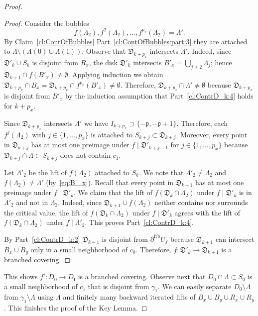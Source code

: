 \documentclass[]{amsart}
\newcommand{\bLambda}{{\mathbb{\Lambda}}}
\newcommand{\pp}{\mathfrak{p}}
\renewcommand{\tt}{\mathfrak{t}}
\newcommand\frb{{\operatorname{frb}}}
\theoremstyle{remark}
\numberwithin{equation}{section}
\theoremstyle{definition}
\begin{document}
\begin{proof}
\begin{proof}
Consider the bubbles \[f(\bLambda_2),f^2(\bLambda_2), \dots , f^{p_x}(\bLambda_2)=\bLambda'.\]
By Claim~\ref{cl:ContOfBubbles} Part~\eqref{cl:ContOfBubbles:part:3} they are attached to $\bLambda\setminus (\Lambda(0)\cup \Lambda(1))$. Observe that $\mathfrak D_{k+p_x}$ intersects $\bLambda'$. Indeed, since $\mathfrak D'_k\cup S_k$ is disjoint from $R_x$, the disk $\mathfrak D'_k$ intersects $B'_x=\bigcup_{j\ge 2} \bLambda_j$; hence $\mathfrak D_{k+1}\cap f(B'_x)\not=\emptyset$. Applying induction we obtain $\mathfrak D_{k+p_x}\cap B_x={\mathfrak D_{k+p_x}\cap f^{p_x}(B'_x)\not=\emptyset}$. Therefore, $\mathfrak D_{k+p_x}\cap \bLambda'\not=\emptyset$ because $\mathfrak D_{k+p_x}$ is disjoint from $B'_x$ by the induction assumption that Part~\eqref{cl:ContrD_k:4} holds for $k+p_x$.  



Since $\mathfrak D_{k+p_x}$ intersects $\bLambda'$ we have $I_{k+p_x}\supset \{-\pp, -\pp+1\}$. Therefore, each $f^j(\bLambda_2)$ with $j\in \{1,\dots, p_x\}$ is attached to $S_{k+j}\subset \overline {\mathfrak D_{k+j}}$. Moreover, every point in $\mathfrak D_{k+j}$ has at most one preimage under $f\mid \mathfrak D'_{k+j-1}$ for $j\in \{1,\dots, p_x\}$ because ${\mathfrak D_{k+j}\cap \bLambda  \subset S_{k+j}}$ does not contain $c_1$.


Let $\bLambda'_2$ be the lift of $f(\bLambda_2)$ attached to $S_{k}$. We note that $\bLambda'_2\not=\bLambda_2$ and $f(\bLambda_2)\not=\bLambda'$ (by~\eqref{eq:B'_x}). Recall that every point in $\mathfrak D_{k+1}$ has at most one preimage under $f\mid \mathfrak D'_k$. We claim that the lift of $f(\mathfrak D_k \cap \bLambda_2)$ under $f\mid \mathfrak D'_k$ is in $\bLambda'_2$ and not in $\bLambda_2$. Indeed, since $\mathfrak D_{k+1} \cup f(\bLambda_2)$ neither contains nor surrounds the critical value, the lift of $f(\mathfrak D_k \cap \bLambda_2)$ under $f\mid \mathfrak D'_k$ agrees with the lift of $f(\mathfrak D_k \cap \bLambda_2)$ under $f\mid \bLambda'_2$. This proves Part~\eqref{cl:ContrD_k:4}.


 


By Part~\eqref{cl:ContrD_k:2} $\mathfrak D_{k+1}$ is disjoint from $\partial^\frb U_f$ because $\mathfrak D_{k+1}$ can intersect $B_x\cup B_y$ only in a small neighborhood of $c_0$. Therefore, $f\colon \mathfrak D'_{k}\to \mathfrak D_{k+1}$ is a branched covering.
\end{proof}

This shows  $f^{\tt}\colon D_{0} \to D_{\tt}$ is a branched covering. Observe next that $D_0\cap \bLambda\subset S_0$ is a small neighborhood of $c_1$ that is disjoint from $\gamma_1$. We can easily separate $D_0\setminus \bLambda$ from $\gamma_1\setminus \bLambda$ using $\bLambda$ and finitely many backward iterated lifts of $B_x\cup B_y\cup R_x\cup R_y$. This finishes the proof of the Key Lemma.
\end{proof}
\end{document}
